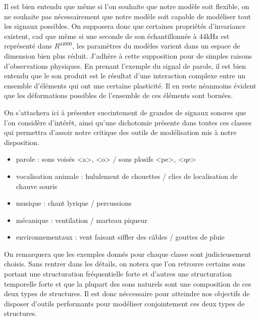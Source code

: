 Il est bien entendu que même si l'on souhaite que notre modèle soit flexible, on ne souhaite pas nécessairement que notre modèle soit capable de modéliser tout les signaux possibles. On supposera donc que certaines propriétés d'invariance existent, cad que même si une seconde de son échantillonnée à 44kHz est représenté dans $R^44000$, les paramètres du modèles varient dans un espace de dimension bien plus réduit. J'adhère à cette supposition pour de simples raisons d'observations physiques. En prenant l'exemple du signal de parole, il est bien entendu que le son produit est le résultat d'une interaction complexe entre un ensemble d'éléments qui ont une certaine plasticité. Il en reste néanmoins évident que les déformations possibles de l'ensemble de ces éléments sont bornées.

On s'attachera ici à présenter succintement de grandes de signaux sonores que l'on considère d'intérêt, ainsi qu'une dichotomie présente dans toutes ces classes qui permettra d'assoir notre critique des outils de modélisation mis à notre disposition.

\begin{itemize}
  \item parole : sons voisés <a>, <o> / sons plosifs <pe>, <qe>
  \item vocalisation animale : hululement de chouettes / clics de localisation de chauve souris
  \item musique : chant lyrique / percussions
  \item mécanique : ventilation / marteau piqueur
  \item environnementaux : vent faisant siffler des câbles / gouttes de pluie
\end{itemize}

On remarquera que les exemples donnés pour chaque classe sont judicieusement choisis. Sans rentrer dans les détails, on notera que l'on retrouve certains sons portant une structuration fréquentielle forte et d'autres une structuration temporelle forte et que la plupart des sons naturels sont une composition de ces deux types de structures. Il est donc néccessaire pour atteindre nos objectifs de disposer d'outils performants pour modéliser conjointement ces deux types de structures.

